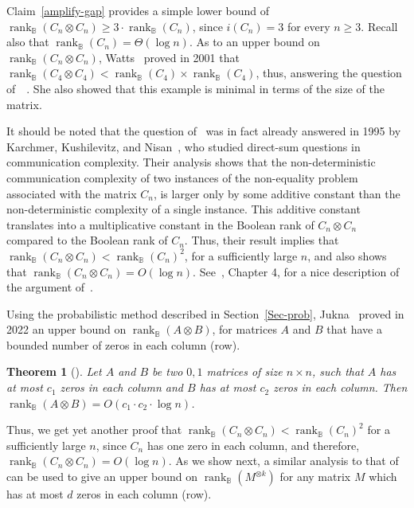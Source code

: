 \documentclass[11pt]{article}
\newtheorem{theorem}{Theorem}
\newcommand{\rank}{\mathop{\mathrm{rank}}}
\newcommand{\Rbool}{{\rank}_\mathbb{B}}
\begin{document}
{{Claim~\ref{amplify-gap} provides a simple lower bound of $\Rbool(C_n \otimes C_n) \geq 3 \cdot \Rbool(C_n)$, since $i(C_n)=3$ for every $n \geq 3$.
Recall also that $\Rbool(C_n) = \Theta(\log n)$.
As to an upper bound on $\Rbool(C_n \otimes C_n)$, Watts~\cite{watts2001boolean} proved in 2001 that $\Rbool(C_4 \otimes C_4) < \Rbool(C_4) \times \Rbool(C_4)$,
thus, answering the question of~~\cite{de1988boolean}. She also showed that this example is minimal in terms of the size of the matrix.

It should be noted that the question of~\cite{de1988boolean} was in fact already answered in 1995 by Karchmer, Kushilevitz, and Nisan~\cite{karchmer1995fractional},
who studied direct-sum questions in communication complexity. Their analysis shows that
the non-deterministic communication complexity of two instances of the non-equality problem associated with the matrix $C_n$,
is larger only by some additive constant than the non-deterministic complexity of a single instance.
This additive constant translates into a multiplicative constant in the Boolean rank of $C_n \otimes C_n$ compared to the Boolean rank of $C_n$.
Thus, their result implies that $\Rbool(C_n \otimes C_n) < \Rbool(C_n)^2$, for a sufficiently large $n$,
and also shows that $\Rbool(C_n \otimes C_n) = O(\log n)$. See~\cite{KN97}, Chapter 4, for a nice description of the argument of~\cite{karchmer1995fractional}.

Using the probabilistic method described in Section~\ref{Sec-prob},
Jukna~\cite{Jukna2022} proved in 2022 an upper bound on $\Rbool(A \otimes B)$, for matrices $A$ and $B$ that have a bounded number of zeros in each column (row).

\begin{theorem}[\cite{Jukna2022}]
Let $A$ and $B$ be two $0,1$ matrices of size $n \times n$, such that $A$ has at most $c_1$ zeros in each column and $B$ has at most  $c_2$ zeros in each column.
Then  $\Rbool(A \otimes B) = O(c_1 \cdot c_2 \cdot \log n)$.
\end{theorem}

Thus, we get yet another proof that $\Rbool(C_n \otimes C_n) < \Rbool(C_n)^2$ for a sufficiently large $n$,
since $C_n$ has one zero in each column, and therefore, $\Rbool(C_n \otimes C_n)  = O(\log n)$.
As we show next, a similar analysis to that of~\cite{Jukna2022} can be used to give an upper bound on  $\Rbool(M^{\otimes k})$
for any matrix $M$ which has at most $d$ zeros in each column (row).

}}
\end{document}
